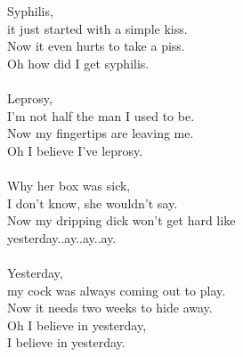 
            Syphilis, \\
            it just started with a simple kiss. \\
            Now it even hurts to take a piss. \\
            Oh how did I get syphilis. \\
\hspace{10mm} \\
            Leprosy, \\
            I’m not half the man I used to be. \\
            Now my fingertips are leaving me. \\
            Oh I believe I’ve leprosy. \\
\hspace{10mm} \\
            Why her box was sick, \\
            I don’t know, she wouldn't say. \\
            Now my dripping dick won’t get hard like \\
            yesterday..ay..ay..ay. \\
\hspace{10mm} \\
            Yesterday, \\
            my cock was always coming out to play. \\
            Now it needs two weeks to hide away. \\
            Oh I believe in yesterday, \\
            I believe in yesterday. \\
\hspace{10mm} \\
            \begin{comment} Lisäsäkeistö: \\
\hspace{10mm} \\
            How I got that sore, \\
            I didn't know she was a whore. \\
            I was indiscreet, \\
            now I've got indected meat. \\
\end{comment}